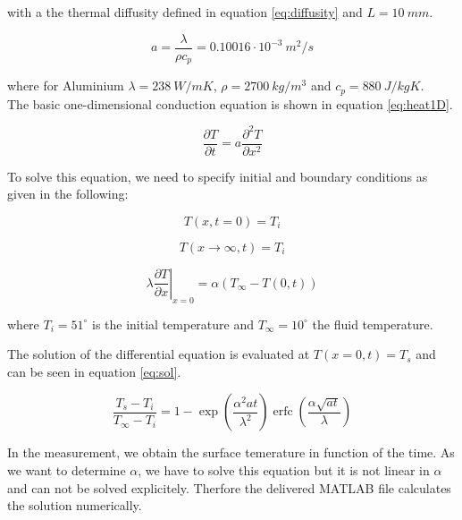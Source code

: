 with a the thermal diffusity defined in equation \ref{eq:diffusity} and $L=10\ mm$. 

\begin{equation}
a=\frac{\lambda}{\rho c_p}=0.10016 \cdot 10^{-3}\ m^2/s
\label{eq:diffusity}
\end{equation} 

where for Aluminium $\lambda=238\ W/mK$, $\rho=2700\ kg/m^3$ and $c_p=880\ J/kg K$. \\

The basic one-dimensional conduction equation is shown in equation \ref{eq:heat1D}.

\begin{equation}
\frac{\partial T}{\partial t}=a \frac{\partial^2 T}{\partial x^2} 
\label{eq:heat1D}
\end{equation}

To solve this equation, we need to specify initial and boundary conditions as given in the following:

\begin{equation}
T(x,t=0) = T_i \nonumber
\end{equation}

\begin{equation}
T(x \rightarrow \infty,t) = T_i \nonumber
\end{equation}

\begin{equation}
\lambda \left. \frac{\partial T}{\partial x}  \right|_{x=0}=\alpha(T_{\infty}-T(0,t)) \nonumber
\end{equation}

where $T_i=51^{\circ}$ is the initial temperature and $T_{\infty}=10^{\circ}$ the fluid temperature.

The solution of the differential equation is evaluated at $ T(x=0,t)=T_s $ and can be seen in equation \ref{eq:sol}. 

\begin{equation}
\frac{T_s-T_i}{T_{\infty}-T_i}=1-\exp \left( \frac{\alpha^2 a t}{\lambda^2}\right)  \operatorname{erfc} \left( \frac{\alpha \sqrt{a t}}{\lambda} \right)
\label{eq:sol}
\end{equation}

In the measurement, we obtain the surface temerature in function of the time. As we want to determine $\alpha$, we have to solve this equation but it is not linear in $\alpha$ and can not be solved explicitely. Therfore the delivered MATLAB file calculates the solution numerically.


